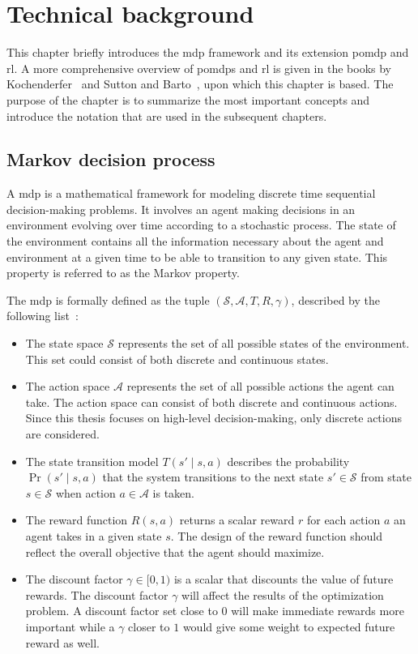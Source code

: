 \chapter{Technical background}\label{ch:background}
This chapter briefly introduces the \gls{mdp} framework and its extension \gls{pomdp} and \gls{rl}. A more comprehensive overview of \gls{pomdp}s and \gls{rl} is given in the books by Kochenderfer~\cite{Kochenderfer2015} and Sutton and Barto~\cite{Sutton2018}, upon which this chapter is based. The purpose of the chapter is to summarize the most important concepts and introduce the notation that are used in the subsequent chapters. 

\section{Markov decision process}\label{sec:background_mdp}
A \gls{mdp} is a mathematical framework for modeling discrete time sequential decision-making problems. It involves an agent making decisions in an environment evolving over time according to a stochastic process. The state of the environment contains all the information necessary about the agent and environment at a given time to be able to transition to any given state. This property is referred to as the Markov property. 

The \gls{mdp} is formally defined as the tuple $( \mathcal{S}, \mathcal{A}, T, R, \gamma )$, described by the following list~\cite{Kochenderfer2015}:
\begin{itemize}
    \item The state space $\mathcal{S}$ represents the set of all possible states of the environment. This set could consist of both discrete and continuous states.
    \item The action space $\mathcal{A}$ represents the set of all possible actions the agent can take. The action space can  consist of both discrete and continuous actions. Since this thesis focuses on high-level decision-making, only discrete actions are considered.
    \item The state transition model $T(s' \mid s,a)$ describes the probability $\Pr(s' \mid s,a)$ that the system transitions to the next state $s' \in \mathcal{S}$ from state $s \in \mathcal{S}$ when action $a \in \mathcal{A}$ is taken.
    \item The reward function $R(s,a)$ returns a scalar reward $r$ for each action $a$ an agent takes in a given state $s$. The design of the reward function should reflect the overall objective that the agent should maximize.
    \item The discount factor $\gamma \in [0,1)$ is a scalar that discounts the value of future rewards. The discount factor $\gamma$ will affect the results of the optimization problem. A discount factor set close to $0$ will make immediate rewards more important while a $\gamma$ closer to $1$ would give some weight to expected future reward as well. 
\end{itemize}

